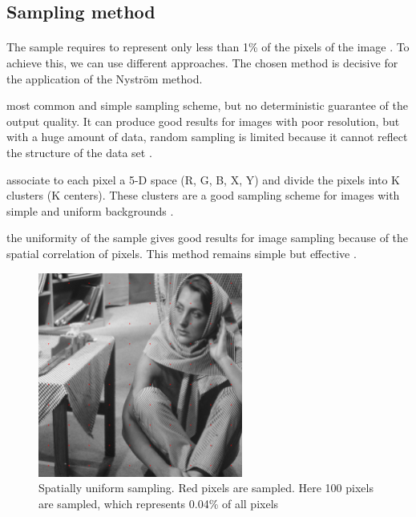 \subsection{Sampling method}
\label{subsec:sampling-variations}

\paragraph{}
The sample requires to represent only less than 1\% of the pixels of the image \cite{glide_2014}.
To achieve this, we can use different approaches. The chosen method is decisive for the application of the Nystr\"om method.
\begin{description}[align=left]
 \item [Random sampling (RS)] most common and simple sampling scheme, but no deterministic guarantee of the output quality. It can produce good results for images with poor resolution, but with a huge amount of data, random sampling is limited because it cannot reflect the structure of the data set \cite{zhan_improved_2017}.
 \item [K-means sampling (KS)] associate to each pixel a 5-D space (R, G, B, X, Y) and divide the pixels into K clusters (K centers). These clusters are a good sampling scheme for images with simple and uniform backgrounds \cite{kao_sampling_2012} \cite{zhang_improved_2008}.
 \item [Uniform spatially sampling] the uniformity of the sample gives good results for image sampling because of the spatial correlation of pixels. This method remains simple but effective \cite{glide_2014}.
  \begin{figure}[H]
      \centering
      \includegraphics[width=0.6\textwidth]{img/spatiallyUniformSampling.png}
      \caption{Spatially uniform sampling. Red pixels are sampled. Here 100 pixels are sampled, which represents 0.04\% of all pixels}

\end{figure}
\end{description}
